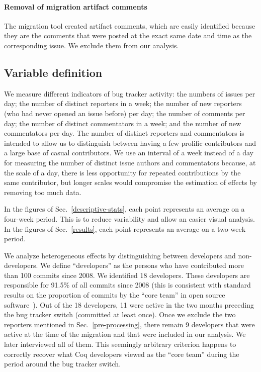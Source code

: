 \documentclass[conference]{IEEEtran}
\begin{document}
\paragraph{Removal of migration artifact comments}
The migration tool created artifact comments, which are easily identified because they are the comments that were posted at the exact same date and time as the corresponding issue. We exclude them from our analysis.

\subsection{Variable definition}

We measure different indicators of bug tracker activity: the numbers of issues per day; the number of distinct reporters in a week; the number of new reporters (who had never opened an issue before) per day; the number of comments per day; the number of distinct commentators in a week; and the number of new commentators per day. The number of distinct reporters and commentators is intended to allow us to distinguish between having a few prolific contributors and a large base of casual contributors. We use an interval of a week instead of a day for measuring the number of distinct issue authors and commentators because, at the scale of a day, there is less opportunity for repeated contributions by the same contributor, but longer scales would compromise the estimation of effects by removing too much data.

In the figures of Sec.~\ref{descriptive-stats}, each point represents an average on a four-week period. This is to reduce variability and allow an easier visual analysis. In the figures of Sec.~\ref{results}, each point represents an average on a two-week period.

We analyze heterogeneous effects by distinguishing between developers and non-developers. We define ``developers'' as the persons who have contributed more than 100 commits since 2008. We identified 18 developers. These developers are responsible for 91.5\% of all commits since 2008 (this is consistent with standard results on the proportion of commits by the ``core team'' in open source software~\cite{robles2009evolution}). Out of the 18 developers, 11 were active in the two months preceding the bug tracker switch (committed at least once). Once we exclude the two reporters mentioned in Sec.~\ref{pre-processing}, there remain 9 developers that were active at the time of the migration and that were included in our analysis. We later interviewed all of them.
This seemingly arbitrary criterion happens to correctly recover what Coq developers viewed as the ``core team'' during the period around the bug tracker switch.
\end{document}
